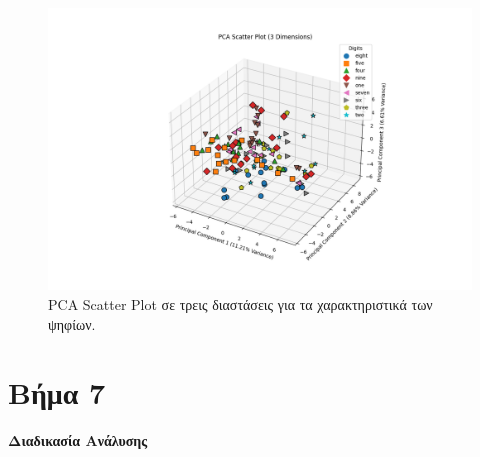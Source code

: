\documentclass[a4paper,12pt]{article}
\begin{document}
\begin{figure}[h]
    \centering
    \includegraphics[width=\textwidth]{images/pca_3d_plot.png}
    \caption{PCA Scatter Plot σε τρεις διαστάσεις για τα χαρακτηριστικά των ψηφίων.}
    \label{fig:pca_3d_plot}
\end{figure}

\section*{Βήμα 7}

\textbf{Διαδικασία Ανάλυσης}
\end{document}
